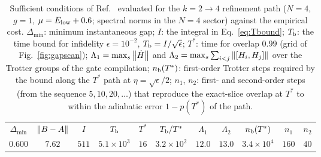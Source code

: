 \documentclass[aps,prc,reprint,superscriptaddress,floatfix,nofootinbib]{revtex4-2}
\begin{document}
\begin{table}[t]
\caption{\label{tab:bound}Sufficient conditions of Ref.~\cite{Sadia2026}
evaluated for the $k=2\to4$ refinement path ($N=4$, $g=1$,
$\mu=E_{\rm low}+0.6$; spectral norms in the $N=4$ sector) against the
empirical cost.  $\Delta_{\min}$: minimum instantaneous gap; $I$: the
integral in Eq.~\eqref{eq:Tbound}; $T_{\rm b}$: the time bound for infidelity
$\epsilon=10^{-2}$, $T_{\rm b}=I/\sqrt{\epsilon}$; $T^{*}$: time for overlap
$0.99$ (grid of Fig.~\ref{fig:gapscan}); $\Lambda_1=\max_s\norm{\dot H}$ and
$\Lambda_2=\max_s\sum_{i<j}\norm{[H_i,H_j]}$ over the Trotter groups of the
gate compilation; $n_{\rm b}(T^{*})$: first-order Trotter steps required by
the bound along the $T^{*}$ path at $\eta=\sqrt{\epsilon}/2$; $n_1$, $n_2$:
first- and second-order steps (from the sequence $5,10,20,\ldots$) that
reproduce the exact-slice overlap at $T^{*}$ to within the adiabatic error
$1-p(T^{*})$ of the path.}
\begin{ruledtabular}
\begin{tabular}{ccccccccccc}
$\Delta_{\min}$ & $\norm{B-A}$ & $I$ & $T_{\rm b}$ & $T^{*}$ & $T_{\rm b}/T^{*}$ & $\Lambda_1$ & $\Lambda_2$ & $n_{\rm b}(T^{*})$ & $n_1$ & $n_2$\\
\colrule
$0.600$ & $7.62$ & $511$ & $5.1\times10^{3}$ & $16$ & $3.2\times10^{2}$ & $12.0$ & $13.0$ & $3.4\times10^{4}$ & $160$ & $40$\\
\end{tabular}
\end{ruledtabular}
\end{table}
\end{document}
